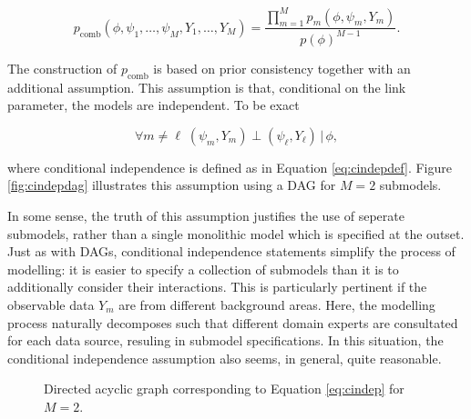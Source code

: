 \documentclass[11pt,]{book}
\begin{document}
\begin{equation}
p_{\mathrm{comb}}(\phi, \psi_1, \ldots, \psi_M, Y_1, \ldots, Y_M) 
= \frac{\prod_{m=1}^{M} p_m(\phi, \psi_m, Y_m)}{p(\phi)^{M-1}}. \label{eq:comb}
\end{equation}

The construction of \(p_{\mathrm{comb}}\) is based on prior consistency
together with an additional assumption. This assumption is that,
conditional on the link parameter, the models are independent. To be
exact

\begin{equation}
\forall m \neq \ell \; (\psi_m, Y_m) \perp (\psi_\ell, Y_\ell) \, | \, \phi, \label{eq:cindep} 
\end{equation}

where conditional independence is defined as in Equation
\eqref{eq:cindepdef}. Figure \eqref{fig:cindepdag} illustrates this
assumption using a DAG for \(M = 2\) submodels.

In some sense, the truth of this assumption justifies the use of
seperate submodels, rather than a single monolithic model which is
specified at the outset. Just as with DAGs, conditional independence
statements simplify the process of modelling: it is easier to specify a
collection of submodels than it is to additionally consider their
interactions. This is particularly pertinent if the observable data
\(Y_m\) are from different background areas. Here, the modelling process
naturally decomposes such that different domain experts are consultated
for each data source, resuling in submodel specifications. In this
situation, the conditional independence assumption also seems, in
general, quite reasonable.

\begin{figure}
\centering
{}
\caption{Directed acyclic graph corresponding to Equation \eqref{eq:cindep} for $M = 2$.}
\label{fig:cindepdag}
\end{figure}
\end{document}

